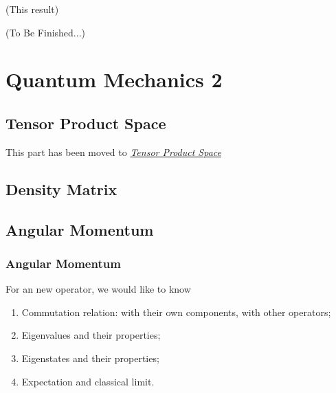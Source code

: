 \documentclass[letterpaper,10pt,english]{sphinxmanual}
\begin{document}
(This result)

(To Be Finished...)


\section{Quantum Mechanics 2}
\label{QuantumMechanics2:quantum-mechanics-2}\label{QuantumMechanics2::doc}

\subsection{Tensor Product Space}
\label{QuantumMechanics2:tensor-product-space}
This part has been moved to {\hyperref[math:tensorproductspace]{\emph{Tensor Product Space}}}


\subsection{Density Matrix}
\label{QuantumMechanics2:density-matrix}

\subsection{Angular Momentum}
\label{QuantumMechanics2:angular-momentum}

\subsubsection{Angular Momentum}
\label{QuantumMechanics2:id1}
For an new operator, we would like to know
\begin{enumerate}
\item {} 
Commutation relation: with their own components, with other operators;

\item {} 
Eigenvalues and their properties;

\item {} 
Eigenstates and their properties;

\item {} 
Expectation and classical limit.

\end{enumerate}
\end{document}
